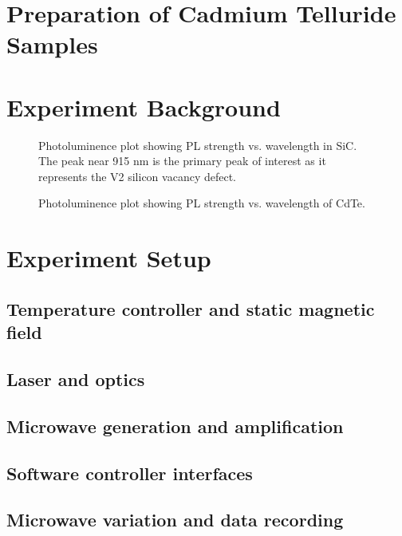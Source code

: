 \documentclass[oneside, astronomy, noacknowlegments]{BYUPhys}
\begin{document}
\section{Preparation of Cadmium Telluride Samples}

\section{Experiment Background}

\begin{figure}
    \caption[Photoluminence Spectra of Silicon Carbide]{\label{fig:SiCZeeman}
      Photoluminence plot showing PL strength vs. wavelength in SiC. The peak near 915 nm is the primary peak of interest as it represents the V2 silicon vacancy defect.}
 \end{figure}
 
\begin{figure}
    \caption[Photoluminence Spectra of Cadmium Telluride]{\label{fig:SiCZeeman}
     Photoluminence plot showing PL strength vs. wavelength of CdTe.}
 \end{figure}
 
\section{Experiment Setup}
\label{sec:Experiment}

\subsection{Temperature controller and static magnetic field}

\subsection{Laser and optics}

\subsection{Microwave generation and amplification}

\subsection{Software controller interfaces}

\subsection{Microwave variation and data recording}
\end{document}
